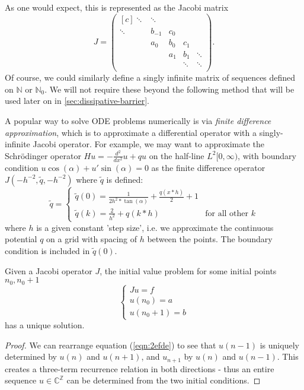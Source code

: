 \documentclass[../main.tex]{subfiles}
\begin{document}
As one would expect, this is represented as the Jacobi matrix
  $$ 
  J = 
  \begin{pmatrix*}[c]
    \ddots & \ddots & & & \\
    \ddots & b_{-1} & c_0 & & \\
    & a_0 & b_0 & c_1 & \\
    & & a_1 & b_1 & \ddots \\
    & & & \ddots & \ddots \\
  \end{pmatrix*}.
  $$
Of course, we could similarly define a singly infinite matrix of sequences defined on $\mathbb{N}$
or $\mathbb{N}_0$. We will not require these beyond the following method that will be used
later on in \ref{sec:dissipative-barrier}.

\begin{example}
\label{ex:finite-differences}
  A popular way to solve ODE problems numerically is via \emph{finite difference approximation},
  which is to approximate a differential operator with a singly-infinite Jacobi operator. For
  example, we may want to approximate the Schr\"odinger operator $Hu = -\frac{d^2}{dx^2}u + qu$
  on the half-line $L^2[0, \infty)$, with boundary condition $u \cos(\alpha) + u' \sin(\alpha) = 0$
  as the finite difference operator
  $J(-h^{-2}, \tilde{q}, -h^{-2})$
  where $\tilde{q}$ is defined:
  $$
  \tilde{q} =
  \begin{cases}
    \tilde{q}(0) = \frac{1}{2h^2 * \tan(\alpha)} + \frac{q(x*h)}{2} + 1 \\
    \tilde{q}(k) = \frac{2}{h^2} + q(k*h) & \text{for all other $k$}
  \end{cases}
  $$
  where $h$ is a given constant 'step size', i.e. we approximate the continuous
  potential $q$ on a grid with spacing of $h$ between the points. The boundary
  condition is included in $\tilde{q}(0)$.
\end{example}

\begin{proposition}\label{thm:2efde-sols} 
  Given a Jacobi operator $J$, the initial value problem for some initial points
  $n_0, n_0 + 1$
  $$
  \begin{cases}
    Ju = f\\
    u(n_0) = a\\ u(n_0 + 1) = b
  \end{cases} 
  $$
  has a unique solution.
\end{proposition}
\begin{proof}
We can rearrange equation (\ref{eqn:2efde}) to see that $u(n-1)$ is uniquely
determined by $u(n)$ and $u(n+1)$, and $u_{n+1}$ by $u(n)$ and
$u(n-1)$. This creates a three-term recurrence relation in both directions -
thus an entire sequence $u \in \mathbb{C}^\mathbb{Z}$ can be determined from the two
initial conditions.
\end{proof}
\end{document}
